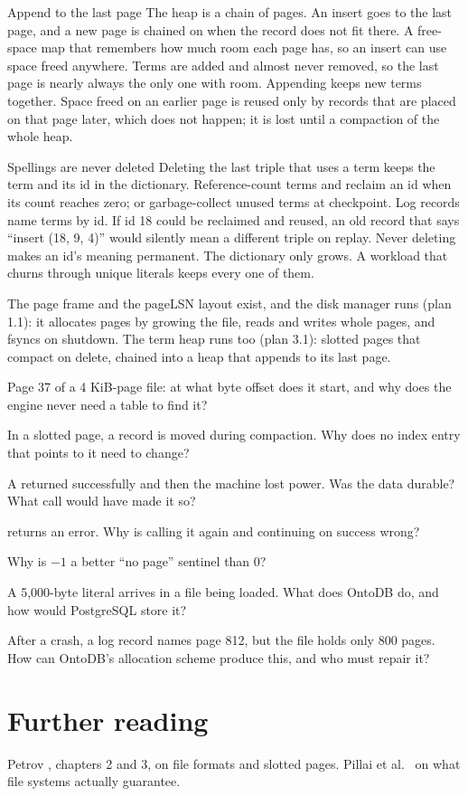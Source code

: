 \begin{decision}{Append to the last page}
 The heap is a chain of pages. An insert goes to the last page,
and a new page is chained on when the record does not fit there.
 A free-space map that remembers how much room each page
has, so an insert can use space freed anywhere.
 Terms are added and almost never removed, so the last page is
nearly always the only one with room. Appending keeps new terms together.
 Space freed on an earlier page is reused only by records that are
placed on that page later, which does not happen; it is lost until a
compaction of the whole heap.
\end{decision}

\begin{decision}{Spellings are never deleted}
 Deleting the last triple that uses a term keeps the term and its
id in the dictionary.
 Reference-count terms and reclaim an id when its count
reaches zero; or garbage-collect unused terms at checkpoint.
 Log records name terms by id. If id 18 could be reclaimed and
reused, an old record that says ``insert (18, 9, 4)'' would silently mean a
different triple on replay. Never deleting makes an id's meaning permanent.
 The dictionary only grows. A workload that churns through unique
literals keeps every one of them.
\end{decision}

\begin{status}
The page frame and the pageLSN layout exist, and the disk manager runs (plan
1.1): it allocates pages by growing the file, reads and writes whole pages, and
fsyncs on shutdown. The term heap runs too (plan 3.1): slotted pages that
compact on delete, chained into a heap that appends to its last page.
\end{status}

\begin{checkyourself}
\item Page 37 of a 4 KiB-page file: at what byte offset does it start, and why does the engine never need a table to find it?
\item In a slotted page, a record is moved during compaction. Why does no index entry that points to it need to change?
\item A  returned successfully and then the machine lost power. Was the data durable? What call would have made it so?
\item {} returns an error. Why is calling it again and continuing on success wrong?
\item Why is $-1$ a better ``no page'' sentinel than 0?
\item A 5,000-byte  literal arrives in a file being loaded. What does OntoDB do, and how would PostgreSQL store it?
\item After a crash, a log record names page 812, but the file holds only 800 pages. How can OntoDB's allocation scheme produce this, and who must repair it?
\end{checkyourself}

\section*{Further reading}
Petrov \cite{petrov}, chapters 2 and 3, on file formats and slotted pages.
Pillai et al.\ \cite{pillai2014} on what file systems actually guarantee.
